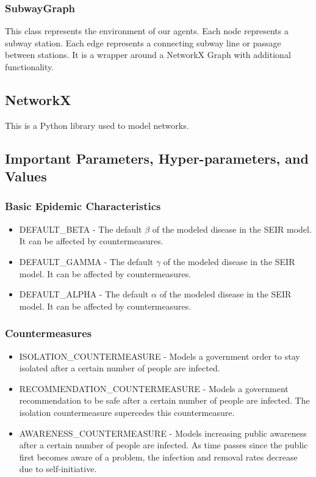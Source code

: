 \documentclass[12pt, a4, epsf] {article}
\theoremstyle{plain}
\theoremstyle{definition}
\begin{document}
\subsubsection{SubwayGraph}
This class represents the environment of our agents. Each node represents a subway station. Each edge represents a connecting subway line or passage between stations. It is a wrapper around a NetworkX Graph with additional functionality.
\subsection{NetworkX\cite{hagberg-2008-exploring}}
This is a Python library used to model networks.
\subsection{Important Parameters, Hyper-parameters, and Values}
\subsubsection{Basic Epidemic Characteristics}
\begin{itemize}
    \item DEFAULT\_BETA - The default $\beta$ of the modeled disease in the SEIR model. It can be affected by countermeasures.
    \item DEFAULT\_GAMMA - The default $\gamma$ of the modeled disease in the SEIR model. It can be affected by countermeasures.
    \item DEFAULT\_ALPHA - The default $\alpha$ of the modeled disease in the SEIR model. It can be affected by countermeasures.
\end{itemize}
\subsubsection{Countermeasures}
\begin{itemize}
    \item ISOLATION\_COUNTERMEASURE - Models a government order to stay isolated after a certain number of people are infected. 
    \item RECOMMENDATION\_COUNTERMEASURE - Models a government recommendation to be safe after a certain number of people are infected. The isolation countermeasure supercedes this countermeasure.
    \item AWARENESS\_COUNTERMEASURE - Models increasing public awareness after a certain number of people are infected. As time passes since the public first becomes aware of a problem, the infection and removal rates decrease due to self-initiative.
\end{itemize}
\end{document}

